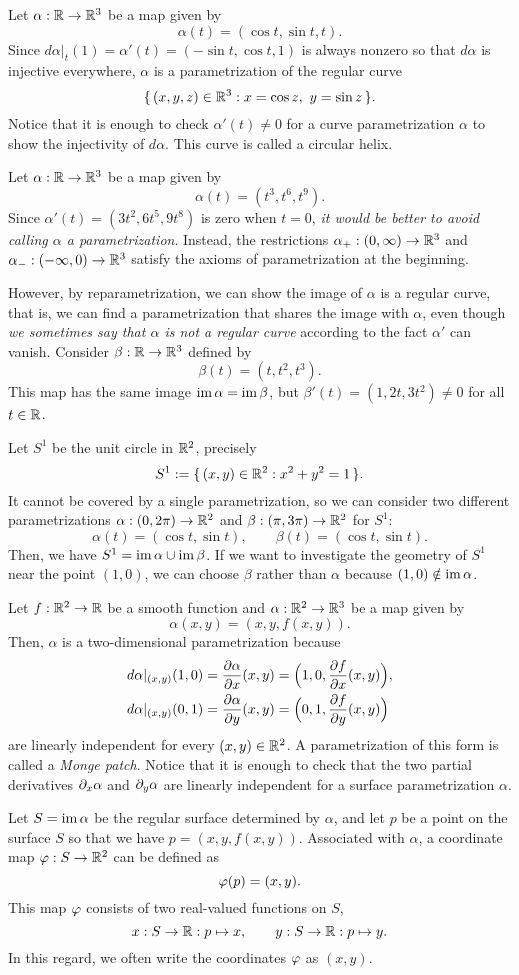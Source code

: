 \documentclass{../exp}
\def\a{\alpha}
\begin{document}
\begin{ex}
Let $\a:\R\to\R^3$ be a map given by
\[\a(t)=(\cos t,\sin t, t).\]
Since $d\a|_t(1)=\a'(t)=(-\sin t,\cos t,1)$ is always nonzero so that $d\a$ is injective everywhere, $\a$ is a parametrization of the regular curve
\[\{\,(x,y,z)\in\mathbb{R}^3:x=\cos z,\ y=\sin z\,\}.\]
Notice that it is enough to check $\a'(t)\ne0$ for a curve parametrization $\a$ to show the injectivity of $d\a$.
This curve is called a circular helix.
\end{ex}
\begin{ex}
Let $\a:\R\to\R^3$ be a map given by
\[\a(t)=(t^3,t^6,t^9).\]
Since $\a'(t)=(3t^2,6t^5,9t^8)$ is zero when $t=0$, \emph{it would be better to avoid calling $\a$ a parametrization}.
Instead, the restrictions $\a_+:(0,\infty)\to\R^3$ and $\a_-:(-\infty,0)\to\R^3$ satisfy the axioms of parametrization at the beginning.

However, by reparametrization, we can show the image of $\a$ is a regular curve, that is, we can find a parametrization that shares the image with $\a$, even though \emph{we sometimes say that $\a$ is not a regular curve} according to the fact $\a'$ can vanish.
Consider $\beta:\R\to\R^3$ defined by
\[\beta(t)=(t,t^2,t^3).\]
This map has the same image $\im\a=\im\beta$, but $\beta'(t)=(1,2t,3t^2)\ne0$ for all $t\in\mathbb{R}$.
\end{ex}
\begin{ex}
Let $S^1$ be the unit circle in $\mathbb{R}^2$, precisely
\[S^1:=\{\,(x,y)\in\mathbb{R}^2:x^2+y^2=1\,\}.\]
It cannot be covered by a single parametrization, so we can consider two different parametrizations $\a:(0,2\pi)\to\R^2$ and $\beta:(\pi,3\pi)\to\R^2$ for $S^1$:
\[\alpha(t)=(\cos t,\sin t),\qquad\beta(t)=(\cos t,\sin t).\]
Then, we have $S^1=\im\a\cup\im\beta$.
If we want to investigate the geometry of $S^1$ near the point $(1,0)$, we can choose $\beta$ rather than $\a$ because $(1,0)\notin\im\a$.
\end{ex}
\begin{ex}
Let $f:\R^2\to\R$ be a smooth function and $\a:\R^2\to\R^3$ be a map given by
\[\a(x,y)=(x,y,f(x,y)).\]
Then, $\a$ is a two-dimensional parametrization because
\begin{align*}
d\a|_{(x,y)}(1,0)&=\pd{\a}{x}(x,y)=\Bigl(1,0,\pd{f}{x}(x,y)\Bigr),\\
d\a|_{(x,y)}(0,1)&=\pd{\a}{y}(x,y)=\Bigl(0,1,\pd{f}{y}(x,y)\Bigr)
\end{align*}
are linearly independent for every $(x,y)\in\mathbb{R}^2$.
A parametrization of this form is called a \emph{Monge patch}.
Notice that it is enough to check that the two partial derivatives $\pd_x\a$ and $\pd_y\a$ are linearly independent for a surface parametrization $\a$.

Let $S=\im\a$ be the regular surface determined by $\a$, and let $p$ be a point on the surface $S$ so that we have $p=(x,y,f(x,y))$.
Associated with $\a$, a coordinate map $\f:S\to\R^2$ can be defined as
\[\varphi(p)=(x,y).\]
This map $\varphi$ consists of two real-valued functions on $S$,
\[x:S\to\R:p\mapsto x,\qquad y:S\to\R:p\mapsto y.\]
In this regard, we often write the coordinates $\varphi$ as $(x,y)$.
\end{ex}
\end{document}
